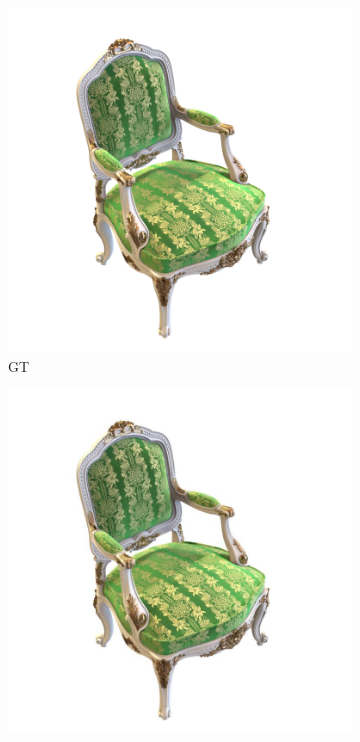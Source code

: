 \documentclass[12pt, a4paper, twoside]{book}
\numberwithin{equation}{chapter}
\numberwithin{theorem}{section}
\numberwithin{definition}{section}
\numberwithin{definitionChapter}{chapter}
\begin{document}
	\begin{figure}[H]
		\centering
		\begin{subfigure}{0.475\textwidth}
			\centering
			\includegraphics[scale=0.25]{img/gt/gt_chair_38.png}
			\caption{GT}
		\end{subfigure}
		\begin{subfigure}{0.475\textwidth}
			\centering
			\includegraphics[scale=0.25]{img/nerf/nerf_chair_38.jpg}

\end{subfigure}
\end{figure}
\end{document}

